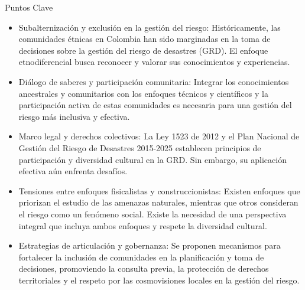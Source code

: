 \documentclass[
  spanish,
  letterpaper,
]{book}
\providecommand{\tightlist}{%
  \setlength{\itemsep}{0pt}\setlength{\parskip}{0pt}}
\begin{document}
\begin{tcolorbox}[enhanced jigsaw, rightrule=.15mm, colframe=quarto-callout-important-color-frame, opacityback=0, arc=.35mm, bottomrule=.15mm, toprule=.15mm, breakable, colback=white, leftrule=.75mm, left=2mm]

Puntos Clave

\begin{itemize}
\tightlist
\item
  Subalternización y exclusión en la gestión del riesgo: Históricamente,
  las comunidades étnicas en Colombia han sido marginadas en la toma de
  decisiones sobre la gestión del riesgo de desastres (GRD). El enfoque
  etnodiferencial busca reconocer y valorar sus conocimientos y
  experiencias.
\item
  Diálogo de saberes y participación comunitaria: Integrar los
  conocimientos ancestrales y comunitarios con los enfoques técnicos y
  científicos y la participación activa de estas comunidades es
  necesaria para una gestión del riesgo más inclusiva y efectiva.
\item
  Marco legal y derechos colectivos: La Ley 1523 de 2012 y el Plan
  Nacional de Gestión del Riesgo de Desastres 2015-2025 establecen
  principios de participación y diversidad cultural en la GRD. Sin
  embargo, su aplicación efectiva aún enfrenta desafíos.
\item
  Tensiones entre enfoques fisicalistas y construccionistas: Existen
  enfoques que priorizan el estudio de las amenazas naturales, mientras
  que otros consideran el riesgo como un fenómeno social. Existe la
  necesidad de una perspectiva integral que incluya ambos enfoques y
  respete la diversidad cultural.
\item
  Estrategias de articulación y gobernanza: Se proponen mecanismos para
  fortalecer la inclusión de comunidades en la planificación y toma de
  decisiones, promoviendo la consulta previa, la protección de derechos
  territoriales y el respeto por las cosmovisiones locales en la gestión
  del riesgo.
\end{itemize}

\end{tcolorbox}
\end{document}
